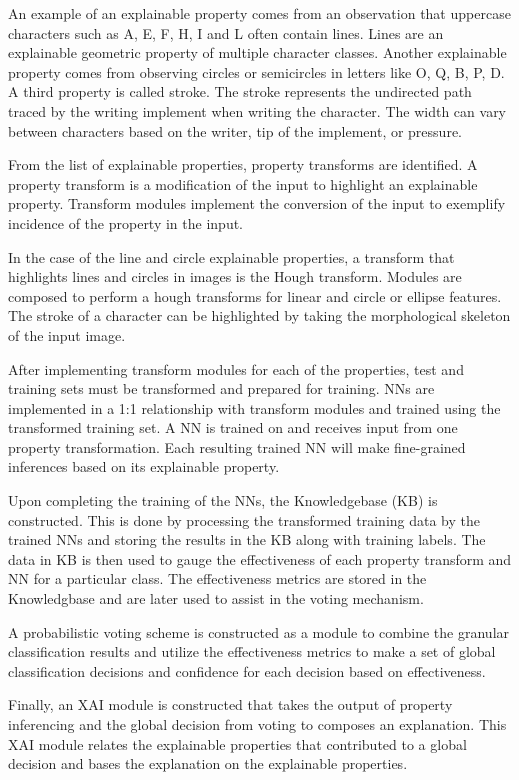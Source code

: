 \documentclass[conference]{IEEEtran}
\begin{document}
An example of an explainable property comes from an observation that uppercase
characters such as A, E, F, H, I and L often contain lines. Lines are an
explainable geometric property of multiple character classes. Another
explainable property comes from observing circles or semicircles in letters like
O, Q, B, P, D. A third property is called stroke.  The stroke represents the
undirected path traced by the writing implement when writing the character.  The
width can vary between characters based on the writer, tip of the implement, or
pressure.

From the list of explainable properties, property transforms are identified.  A
property transform is a modification of the input to highlight an explainable
property.  Transform modules implement the conversion of the input to exemplify
incidence of the property in the input.

In the case of the line and circle explainable properties, a transform that
highlights lines and circles in images is the Hough
transform\cite{Hough1959qva}.  Modules are composed to perform a hough
transforms for linear and circle or ellipse features.  The stroke of a character
can be highlighted by taking the morphological skeleton\cite{LEE1994} of the
input image.

After implementing transform modules for each of the properties, test and
training sets must be transformed and prepared for training. NNs are implemented
in a 1:1 relationship with transform modules and trained using the transformed
training set.  A NN is trained on and receives input from one property
transformation.  Each resulting trained NN will make fine-grained inferences
based on its explainable property.

Upon completing the training of the NNs, the Knowledgebase (KB) is constructed.
This is done by processing the transformed training data by the trained NNs and
storing the results in the KB along with training labels.  The data in KB is
then used to gauge the effectiveness of each property transform and NN for a
particular class.  The effectiveness metrics are stored in the Knowledgbase and
are later used to assist in the voting mechanism.

A probabilistic voting scheme is constructed as a module to combine the granular
classification results and utilize the effectiveness metrics to make a set of
global classification decisions and confidence for each decision based on
effectiveness.

Finally, an XAI module is constructed that takes the output of property
inferencing and the global decision from voting to composes an explanation.
This XAI module relates the explainable properties that contributed to a global
decision and bases the explanation on the explainable properties.
\end{document}
